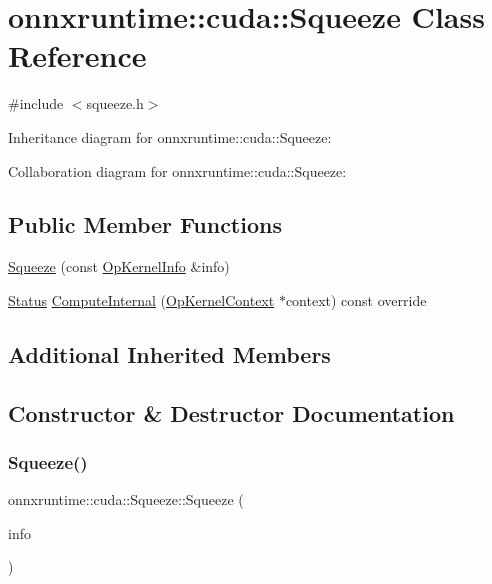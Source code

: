 \hypertarget{classonnxruntime_1_1cuda_1_1Squeeze}{}\section{onnxruntime\+:\+:cuda\+:\+:Squeeze Class Reference}
\label{classonnxruntime_1_1cuda_1_1Squeeze}


{\ttfamily \#include $<$squeeze.\+h$>$}



Inheritance diagram for onnxruntime\+:\+:cuda\+:\+:Squeeze\+:


Collaboration diagram for onnxruntime\+:\+:cuda\+:\+:Squeeze\+:
\subsection*{Public Member Functions}
\begin{DoxyCompactItemize}
\item 
\mbox{\hyperlink{classonnxruntime_1_1cuda_1_1Squeeze_aa26e804ae47b6a6e4685697b5c4cfa39}{Squeeze}} (const \mbox{\hyperlink{classonnxruntime_1_1OpKernelInfo}{Op\+Kernel\+Info}} \&info)
\item 
\mbox{\hyperlink{classonnxruntime_1_1common_1_1Status}{Status}} \mbox{\hyperlink{classonnxruntime_1_1cuda_1_1Squeeze_a73b6b12616870d3b63a35b4c9854b4ad}{Compute\+Internal}} (\mbox{\hyperlink{classonnxruntime_1_1OpKernelContext}{Op\+Kernel\+Context}} $\ast$context) const override
\end{DoxyCompactItemize}
\subsection*{Additional Inherited Members}


\subsection{Constructor \& Destructor Documentation}
\mbox{\label{classonnxruntime_1_1cuda_1_1Squeeze_aa26e804ae47b6a6e4685697b5c4cfa39}} 
\subsubsection{\texorpdfstring{Squeeze()}{Squeeze()}}
{\footnotesize\ttfamily onnxruntime\+::cuda\+::\+Squeeze\+::\+Squeeze (\begin{DoxyParamCaption}\item[{const \mbox{\hyperlink{classonnxruntime_1_1OpKernelInfo}{Op\+Kernel\+Info}} \&}]{info }\end{DoxyParamCaption})\hspace{0.3cm}{\ttfamily [inline]}}



